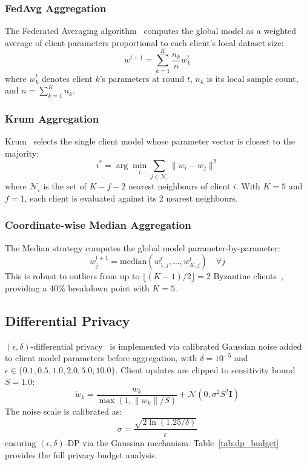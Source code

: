 \documentclass[conference]{IEEEtran}
\begin{document}
\subsubsection{FedAvg Aggregation}
The Federated Averaging algorithm~\cite{mcmahan2017} computes the
global model as a weighted average of client parameters proportional
to each client's local dataset size:
\begin{equation}
w^{t+1} = \sum_{k=1}^{K} \frac{n_k}{n} w_k^t
\label{eq:fedavg}
\end{equation}
where $w_k^t$ denotes client $k$'s parameters at round $t$,
$n_k$ is its local sample count, and $n = \sum_{k=1}^K n_k$.

\subsubsection{Krum Aggregation}
Krum~\cite{blanchard2017} selects the single client model whose
parameter vector is closest to the majority:
\begin{equation}
i^* = \arg\min_i \sum_{j \in \mathcal{N}_i} \|w_i - w_j\|^2
\label{eq:krum}
\end{equation}
where $\mathcal{N}_i$ is the set of $K - f - 2$ nearest neighbours of
client $i$.
With $K=5$ and $f=1$, each client is evaluated against its 2 nearest
neighbours.

\subsubsection{Coordinate-wise Median Aggregation}
The Median strategy computes the global model parameter-by-parameter:
\begin{equation}
w^{t+1}_j = \text{median}(w_{1,j}^t, \ldots, w_{K,j}^t)
  \quad \forall j
\label{eq:median}
\end{equation}
This is robust to outliers from up to $\lfloor (K-1)/2 \rfloor = 2$
Byzantine clients~\cite{yin2018}, providing a 40\% breakdown point
with $K=5$.

\subsection{Differential Privacy}

$(\epsilon,\delta)$-differential privacy~\cite{dwork2006,abadi2016}
is implemented via calibrated Gaussian noise added to client model
parameters before aggregation, with $\delta=10^{-5}$ and
$\epsilon \in \{0.1, 0.5, 1.0, 2.0, 5.0, 10.0\}$.
Client updates are clipped to sensitivity bound $S=1.0$:
\begin{equation}
\tilde{w}_k = \frac{w_k}{\max(1, \|w_k\|/S)}
  + \mathcal{N}(0, \sigma^2 S^2 \mathbf{I})
\label{eq:dp_noise}
\end{equation}
The noise scale is calibrated as:
\begin{equation}
\sigma = \frac{\sqrt{2\ln(1.25/\delta)}}{\epsilon}
\label{eq:sigma}
\end{equation}
ensuring $(\epsilon,\delta)$-DP via the Gaussian mechanism.
Table~\ref{tab:dp_budget} provides the full privacy budget analysis.
\end{document}
